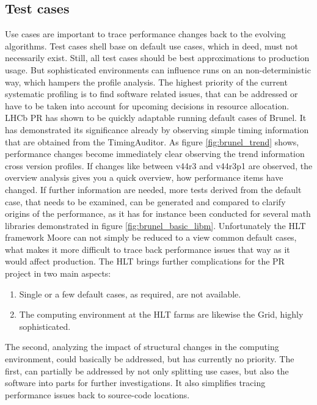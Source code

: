 \documentclass[a4paper]{jpconf}
\begin{document}
\subsection{Test cases}
\label{sec:test_cases}

Use cases are important to trace performance changes back to the evolving algorithms. Test cases shell base on default use cases, which in deed, must not necessarily exist. Still, all test cases should be best approximations to production usage. But sophisticated environments can influence runs on an non-deterministic way, which hampers the profile analysis. The highest priority of the current systematic profiling is to find software related issues, that can be addressed or have to be taken into account for upcoming decisions in resource allocation.
\newline
LHCb PR has shown to be quickly adaptable running default cases of Brunel. It has demonstrated its significance already by observing simple timing information that are obtained from the TimingAuditor. As figure \ref{fig:brunel_trend} shows, performance changes become immediately clear observing the trend information cross version profiles. If changes like between v44r3 and v44r3p1 are observed, the overview analysis gives you a quick overview, how performance items have changed. If further information are needed, more tests derived from the default case, that needs to be examined, can be generated and compared to clarify origins of the performance, as it has for instance been conducted for several math libraries demonstrated in figure \ref{fig:brunel_basic_libm}.  
\newline
Unfortunately the HLT framework Moore can not simply be reduced to a view common default cases, what makes it more difficult to trace back performance issues that way as it would affect production. The HLT brings further complications for the PR project in two main aspects:
\begin{enumerate}
 \item Single or a few default cases, as required, are not available.
 \item The computing environment at the HLT farms are likewise the Grid, highly sophisticated.
\end{enumerate}
The second, analyzing the impact of structural changes in the computing environment, could basically be addressed, but has currently no priority. The first, can partially be addressed by not only splitting use cases, but also the software into parts for further investigations. It also simplifies tracing performance issues back to source-code locations. 
\end{document}
